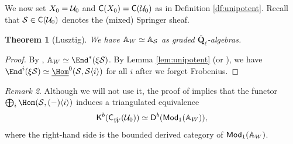 \documentclass[a4paper,10pt,leqno]{amsart}
\theoremstyle{plain}
\theoremstyle{plain}
\newtheorem{thm}{Theorem}[subsection]
\theoremstyle{plain}
\theoremstyle{definition}
\theoremstyle{remark}
\newtheorem{rem}[thm]{Remark}
\newcommand{\Mod}{\mathsf{Mod}}
\newcommand{\QL}{\bar{\mathbf{Q}}_\ell}
\begin{document}
\subsection{}

We now set $X_0 = \cal{U}_0$ and $\sf{C}(X_0) = \sf{C}(\cal{U}_0)$ as in Definition \ref{df:unipotent}.
Recall that $\cal{S} \in \sf{C}(\cal{U}_0)$ denotes the (mixed) Springer sheaf.

\begin{thm}[Lusztig]\label{thm:lusztig-algebra}
We have $\bb{A}_W \simeq \bb{A}_\cal{S}$ as graded $\QL$-algebras.
\end{thm}

\begin{proof}
By \cite[Cor.\ 6.4]{lusztig_1988}, $\bb{A}_W 
\simeq \End^\ast(\xi \cal{S})$.
By Lemma \ref{lem:unipotent} (or \cite[Lem.\ 5.4]{rider}), we have $\End^i(\xi\cal{S}) \simeq \SHom^0(\cal{S}, \cal{S}\langle i\rangle)$ for all $i$ after we forget Frobenius.
\end{proof}

\begin{rem}
Although we will not use it, the proof of \cite[Prop.\ 6.5]{rider} implies that the functor $\bigoplus_i \Hom(\cal{S}, (-)\langle i\rangle)$ induces a triangulated equivalence
\begin{align}
\sf{K}^b(\sf{C}_{\hat{W}}(\cal{U}_0))
\simeq \sf{D}^b(\Mod_1(\bb{A}_W)),
\end{align}
where the right-hand side is the bounded derived category of $\Mod_1(\bb{A}_W)$.
\end{rem}
\end{document}
